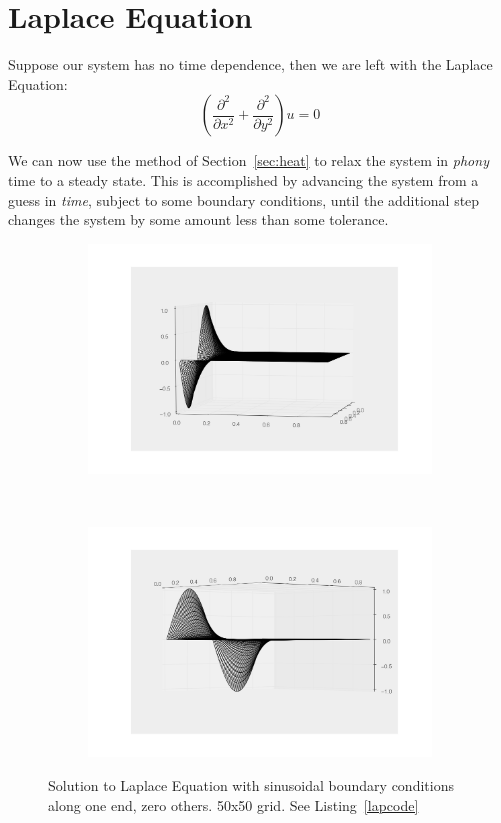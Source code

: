 \documentclass[paper=a4, fontsize=11pt, abstract=on]{scrartcl} %
\numberwithin{equation}{section}
\numberwithin{figure}{section}
\numberwithin{table}{section}
\begin{document}
\section{Laplace Equation} 
\label{sec:laplace}

Suppose our system has no time dependence, then we are left with the Laplace Equation:
\begin{equation}
  \label{eq:lap}
  \left(
    \frac{\partial ^2}{\partial x ^2} + \frac{\partial ^2}{\partial y ^2}
  \right)u = 0
\end{equation}

We can now use the method of Section~\ref{sec:heat} to relax the system in \emph{phony} time to a steady state. This is accomplished by advancing the system from a guess in \emph{time}, subject to some boundary conditions, until the additional step changes the system by some amount less than some tolerance. 
\begin{figure}
  \centering
  \begin{subfigure}[b]{0.65\textwidth}
    \includegraphics[width=\textwidth]{laplace}
    \label{fig:lap1}
  \end{subfigure}
  ~
  \begin{subfigure}[b]{0.65\textwidth}
    \includegraphics[width=\textwidth]{laplace2}
    \label{fig:lap2}
  \end{subfigure}
  \caption{Solution to Laplace Equation with sinusoidal boundary conditions along one end, zero others. 50x50 grid. See Listing~\ref{lapcode}}
  \label{fig:lap}
\end{figure}
\end{document}
